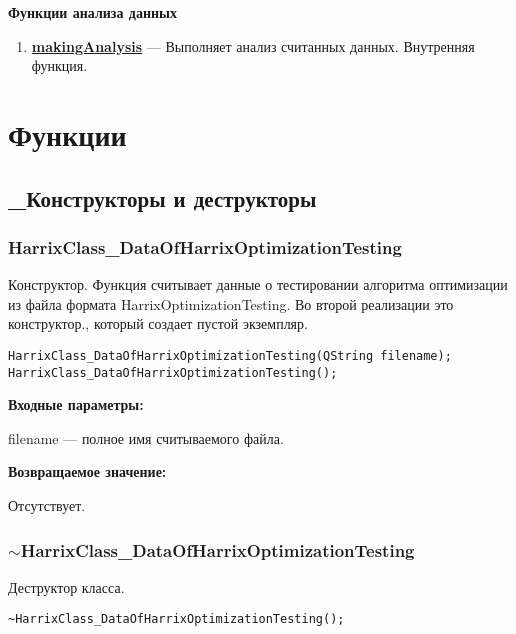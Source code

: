 \documentclass[a4paper,12pt]{article}
\begin{document}
\textbf{Функции анализа данных}
\begin{enumerate}

\item \textbf{\hyperref[makingAnalysis]{makingAnalysis}} --- Выполняет анализ считанных данных. Внутренняя функция.

\end{enumerate}


\newpage
\section{Функции}
\subsection{\_Конструкторы и деструкторы}

\subsubsection{HarrixClass\_DataOfHarrixOptimizationTesting}\label{HarrixClass_DataOfHarrixOptimizationTesting}

Конструктор. Функция считывает данные о тестировании алгоритма оптимизации из файла формата HarrixOptimizationTesting. Во второй реализации это конструктор., который создает пустой экземпляр.


\begin{lstlisting}[label=code_syntax_HarrixClass_DataOfHarrixOptimizationTesting,caption=Синтаксис]
HarrixClass_DataOfHarrixOptimizationTesting(QString filename);
HarrixClass_DataOfHarrixOptimizationTesting();
\end{lstlisting}

\textbf{Входные параметры:}

filename --- полное имя считываемого файла.

\textbf{Возвращаемое значение:}

Отсутствует.


\subsubsection{$\sim$HarrixClass\_DataOfHarrixOptimizationTesting}\label{tildaHarrixClass_DataOfHarrixOptimizationTesting}

Деструктор класса.


\begin{lstlisting}[label=code_syntax_tildaHarrixClass_DataOfHarrixOptimizationTesting,caption=Синтаксис]
~HarrixClass_DataOfHarrixOptimizationTesting();
\end{lstlisting}
\end{document}
